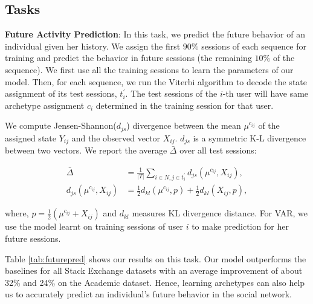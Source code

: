 \subsection{Tasks}
\label{sec:tasks}
\textbf{Future Activity Prediction}:
In this task, we predict the future behavior of an individual given her history. We assign the first $90\%$ sessions of each sequence for training and predict the behavior in future sessions (the remaining $10\%$ of the sequence). We first use all the training sessions to learn the parameters of our model. Then, for each sequence, we run the Viterbi algorithm to decode the state assignment of its test sessions, \emph{$t^\prime_i$}. The test sessions of the $i$-th user will have same archetype assignment $c_i$ determined in the training session for that user.

We compute Jensen-Shannon($d_{js}$) divergence between the mean $\mu^{c_{ij}}$ of the assigned state $Y_{ij}$ and the observed vector $X_{ij}$. $d_{js}$ is a symmetric K-L divergence between two vectors. We report the average $\bar{\Delta}$ over all test sessions:

\begin{align}
    \label{eq:pred}
    \bar{\Delta} &= \frac{1}{\textit{$|T|$}} \sum_{i \in N, j \in t^\prime_i} d_{js}(\mu^{c_{ij}}, X_{ij}), \\
    d_{js}(\mu^{c_{ij}}, X_{ij}) & = \frac{1}{2}d_{kl}(\mu^{c_{ij}}, p) + \frac{1}{2}d_{kl}(X_{ij}, p),
\end{align}

where, $p = \frac{1}{2}(\mu^{c_{ij}} + X_{ij})$ and $d_{kl}$ measures KL divergence distance. For VAR, we use the model learnt on training sessions of  user $i$ to make prediction for her future sessions.

Table \ref{tab:futurepred} shows our results on this task.
Our model outperforms the baselines for all Stack Exchange datasets with an average improvement of about 32\% and 24\% on the Academic dataset.
Hence, learning archetypes can also help us to accurately predict an individual's future behavior in the social network.

